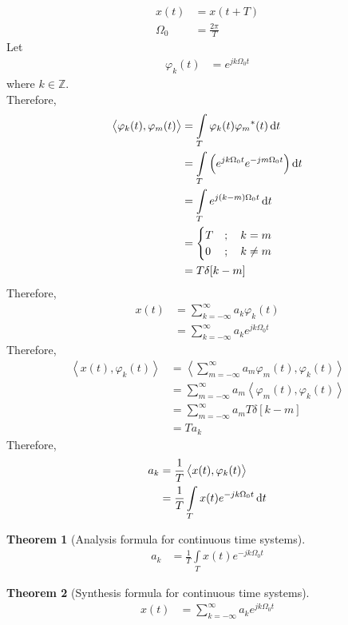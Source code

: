 \documentclass[titlepage, fleqn, a4paper, 12pt, twoside]{article}
\theoremstyle{definition}
\theoremstyle{theorem}
\newtheorem{theorem}{Theorem}
\begin{document}
\begin{align*}
	x(t) &= x(t + T)\\
	\Omega_0 &= \frac{2 \pi}{T}
\end{align*}
Let
\begin{align*}
	\varphi_k(t) &= e^{j k \Omega_0 t}
\end{align*}
where $k \in \mathbb{Z}$.\\
Therefore,
\begin{align*}
	\left\langle \varphi_k(t),\varphi_m(t) \right\rangle &= \int\limits_{T} \varphi_k(t) {\varphi_m}^*(t) \dif t\\
	&= \int\limits_{T} \left( e^{j k \Omega_0 t} e^{-j m \Omega_0 t} \right) \dif t\\
	&= \int\limits_{T} e^{j (k - m) \Omega_0 t} \dif t\\
	&=
		\begin{cases}
			T &;\quad k = m\\
			0 &;\quad k \neq m\\
		\end{cases}\\
	&= T \delta[k - m]
\end{align*}
Therefore,
\begin{align*}
	x(t) &= \sum\limits_{k = -\infty}^{\infty} a_k \varphi_k(t)\\
	&= \sum\limits_{k = -\infty}^{\infty} a_k e^{j k \Omega_0 t}
\end{align*}
Therefore,
\begin{align*}
	\left\langle x(t),\varphi_k(t) \right\rangle &= \left\langle \sum\limits_{m = -\infty}^{\infty} a_m \varphi_m(t) , \varphi_k(t) \right\rangle\\
	&= \sum\limits_{m = -\infty}^{\infty} a_m \left\langle \varphi_m(t),\varphi_k(t) \right\rangle\\
	&= \sum\limits_{m = -\infty}^{\infty} a_m T \delta[k - m]\\
	&= T a_k
\end{align*}
Therefore,
\begin{align*}
	a_k &= \frac{1}{T} \left\langle x(t),\varphi_k(t) \right\rangle\\
	&= \frac{1}{T} \int\limits_{T} x(t) e^{-j k \Omega_0 t} \dif t\\
\end{align*}

\begin{theorem}[Analysis formula for continuous time systems]
	\begin{align*}
		a_k &= \frac{1}{T} \int\limits_{T} x(t) e^{-j k \Omega_0 t}
	\end{align*}
\end{theorem}

\begin{theorem}[Synthesis formula for continuous time systems]
	\begin{align*}
		x(t) &= \sum\limits_{k = -\infty}^{\infty} a_k e^{j k \Omega_0 t}
	\end{align*}
\end{theorem}
\end{document}
